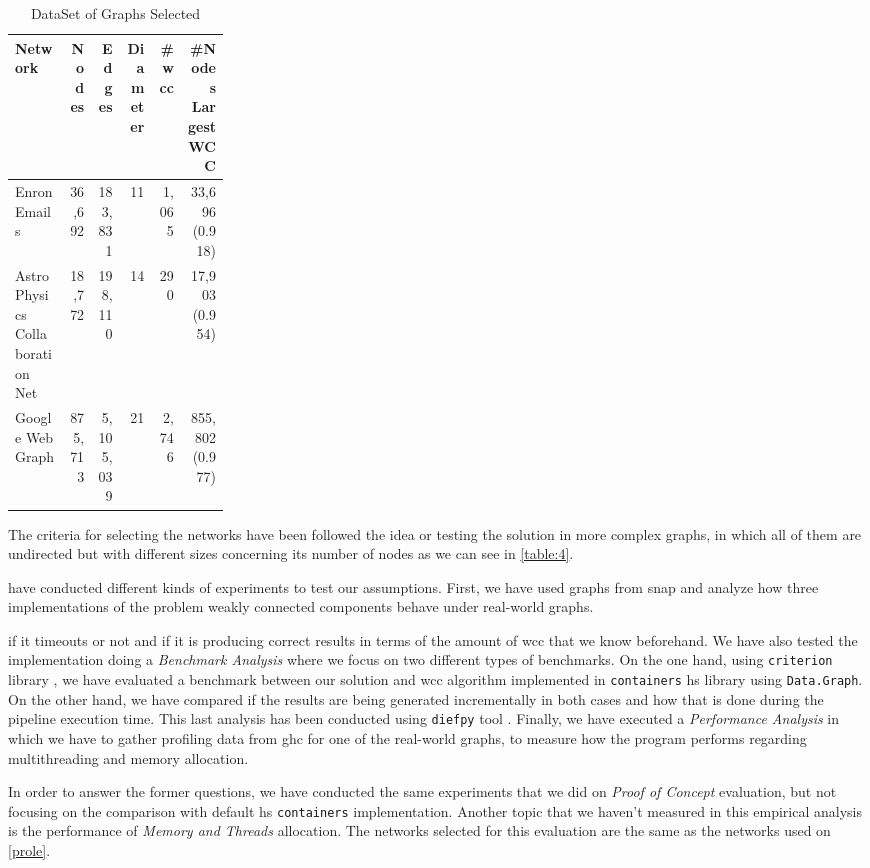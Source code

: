 \begin{table}[H]
  \centering
  \begin{tabular}{|p{0.25\linewidth}|r|r|r|r|r|}
   \hline
   \textbf{Network} & \textbf{Nodes} & \textbf{Edges} & \textbf{Diameter} & \textbf{\#\acrshort{wcc}} & \textbf{\#Nodes Largest WCC} \\
   \hline
   Enron Emails & 36,692 & 183,831 & 11 & 1,065 & 33,696 (0.918) \\
   \hline
   Astro Physics Collaboration Net & 18,772 & 198,110 & 14 & 290 & 17,903 (0.954)\\
   \hline
   Google Web Graph & 875,713 & 5,105,039 & 21 & 2,746 & 855,802 (0.977)\\
   \hline
  \end{tabular}
 \caption{DataSet of Graphs Selected}
 \label{table:4}
 \end{table}
 
 The criteria for selecting the networks have been followed the idea or testing the solution in more complex graphs, in which all of them are undirected but with different sizes concerning its number of nodes as we can see in  \autoref{table:4}. 
 
 \iffalse
have conducted different kinds of experiments to test our assumptions.
First, we have used graphs from \acrfull{snap} \cite{stanford} and analyze how three implementations of the problem weakly connected components behave under real-world graphs. 

if it timeouts or not and if it is producing correct results in terms of the amount of \acrshort{wcc} that we know beforehand.
We have also tested the implementation doing a \emph{Benchmark Analysis} where we focus on two different types of benchmarks. On the one hand, using \texttt{criterion} library \cite{criterion}, we have evaluated a benchmark between our solution and \acrshort{wcc} algorithm implemented in \texttt{containers} \acrshort{hs} library \cite{containers} using \texttt{Data.Graph}. On the other hand, we have compared if the results are being generated incrementally in both cases and how that is done during the pipeline execution time. This last analysis has been conducted using \texttt{diefpy} tool \cite{diefpaper,diefpy}.
Finally, we have executed a \textit{Performance Analysis} in which we have to gather profiling data from \acrfull{ghc} for one of the real-world graphs, to measure how the program performs regarding multithreading and memory allocation.


In order to answer the former questions, we have conducted the same experiments that we did on \textit{Proof of Concept} evaluation, but not focusing on the comparison with default \acrshort{hs} \texttt{containers} implementation. 
Another topic that we haven't measured in this empirical analysis is the performance of \textit{Memory and Threads} allocation. 
The networks selected for this evaluation are the same as the networks used on \autoref{prole}.

